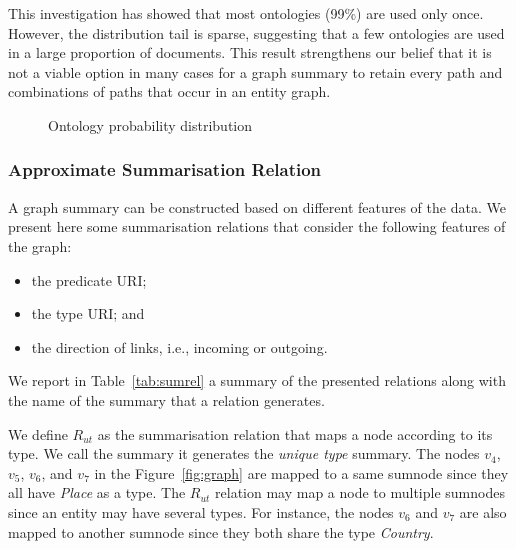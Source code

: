 This investigation has showed that most ontologies (99\%) are used only once. However, the distribution tail is sparse, suggesting that a few ontologies are used in a large proportion of documents.
This result strengthens our belief that it is not a viable option in many cases for a graph summary to retain every path and combinations of paths that occur in an entity graph.

\begin{figure}
	\centering
	
	\caption{Ontology probability distribution}
	\label{fig:onto-dist}
\end{figure}


\subsubsection{Approximate Summarisation Relation}

A graph summary can be constructed based on different features of the data. We present here some summarisation relations that consider the following features of the graph:
\begin{itemize}
	\item the predicate URI;
	\item the type URI; and
	\item the direction of links, i.e., incoming or outgoing.
\end{itemize}
We report in Table~\ref{tab:sumrel} a summary of the presented relations along with the name of the summary that a relation generates.


We define $R_{ut}$ as the summarisation relation that maps a node according to its type. We call the summary it generates the \emph{\emph{unique type}} summary.
The nodes $v_4$, $v_5$, $v_6$, and $v_7$ in the Figure~\ref{fig:graph} are mapped to a same sumnode since they all have \emph{Place} as a type. The $R_{ut}$ relation may map a node to multiple sumnodes since an entity may have several types. For instance, the nodes $v_6$ and $v_7$ are also mapped to another sumnode since they both share the type \emph{Country}.

